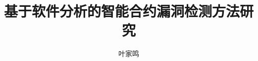 \documentclass[master, professional, chinese, print]{ustcthesis}
\title{基于软件分析的智能合约漏洞检测方法研究}
\author{叶家鸣}
\begin{document}

%

\maketitle
\makestatement

\frontmatter

\tableofcontents
%

\mainmatter







\backmatter


\end{document}
